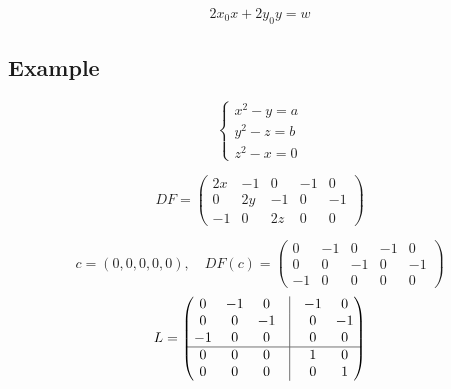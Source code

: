 \documentclass[11pt]{article}
\begin{document}
\[
2x_0 x + 2y_0 y = w
\]

\subsection*{Example}
\[
\begin{cases}
    x^2 - y = a \\
    y^2 - z = b \\
    z^2 - x = 0
\end{cases}
\]

\[
DF = \begin{pmatrix}
    2x & -1 & 0 & -1 & 0 \\
    0 & 2y & -1 & 0 & -1 \\
    -1 & 0 & 2z & 0 & 0
\end{pmatrix}
\]

\[
c = (0, 0,0,0,0), \quad DF(c) = \begin{pmatrix}
    0 & -1 & 0 & -1 & 0 \\
    0 & 0 & -1 & 0 & -1 \\
    -1 & 0 & 0 & 0 & 0
\end{pmatrix}
\]
\[
L = \begin{pmatrix}
    0 & -1 & 0 & \vline & -1 & 0 \\
    0 & 0 & -1 & \vline & 0 & -1 \\
    -1 & 0 & 0 & \vline & 0 & 0 \\
    \hline 
    0 & 0 & 0 & \vline & 1 & 0 \\
    0 & 0 & 0 & \vline & 0 & 1
\end{pmatrix}
\]
\end{document}
